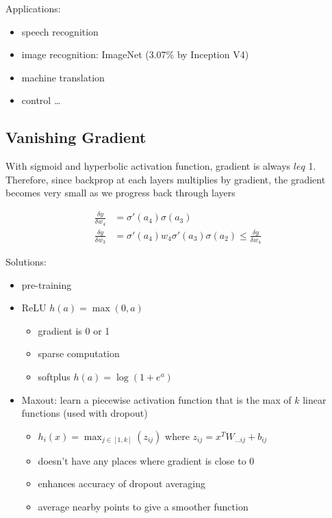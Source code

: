 \documentclass[]{article}
\theoremstyle{definition}
\begin{document}
Applications:
\begin{itemize}
    \item speech recognition
    \item image recognition: ImageNet (3.07\% by Inception V4)
    \item machine translation
    \item control \ldots
\end{itemize}

\subsection{Vanishing Gradient}
\label{sub:vanishing_gradient}

With sigmoid and hyperbolic activation function, gradient is always $leq$ 1. Therefore, since backprop at each layers multiplies by gradient, the gradient becomes very small as we progress back through layers

\begin{align*}
    \frac{\delta y}{\delta w_4} &= \sigma'(a_4) \sigma(a_3) \\
    \frac{\delta y}{\delta w_3} &= \sigma'(a_4) w_4 \sigma'(a_3) \sigma(a_2) \leq \frac{\delta y}{\delta w_4} 
\end{align*}

Solutions:
\begin{itemize}
    \item pre-training
    \item ReLU $h(a) = \max(0, a)$
        \begin{itemize}
            \item gradient is 0 or 1
            \item sparse computation
            \item softplus $h(a) = \log (1 + e^a)$
        \end{itemize}
    \item Maxout: learn a piecewise activation function that is the max of $k$ linear functions (used with dropout)
        \begin{itemize}
            \item $h_i(x) = \max_{j \in [1, k]} (z_{ij})$ where $z_{ij} = x^T W_{ \ldots ij} + b_{ij}$
            \item doesn't have any places where gradient is close to 0
            \item enhances accuracy of dropout averaging
            \item average nearby points to give a smoother function
        \end{itemize}
\end{itemize}
\end{document}
